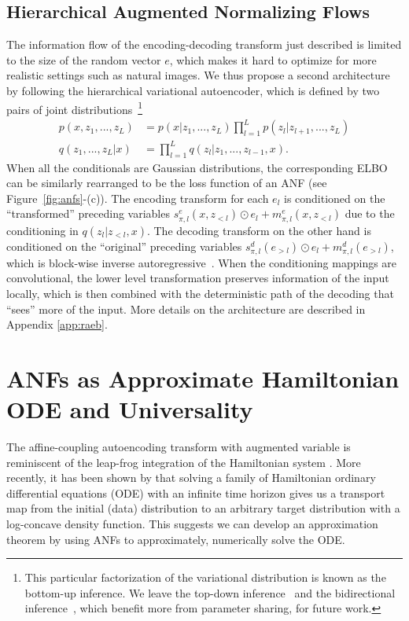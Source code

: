 \documentclass{article}
\begin{document}
\subsection{Hierarchical Augmented Normalizing Flows}
The information flow of the encoding-decoding transform just described is limited to the size of the random vector $e$, which makes it hard to optimize for more realistic settings such as natural images. 
We thus propose a second architecture by following the hierarchical variational autoencoder, which is defined by two pairs of joint distributions~\footnote{This particular factorization of the variational distribution is known as the bottom-up inference. We leave the top-down inference~\citep{kingma2016improved} and the bidirectional inference~\citep{maaloe2019biva}, which benefit more from parameter sharing, for future work.} 
\begin{align*}
p(x,z_1,...,z_L)&=p(x|z_1,...,z_L)\prod_{l=1}^L p(z_l|z_{l+1},...,z_L) \\
q(z_1,...,z_L|x)&=\prod_{l=1}^L q(z_l|z_{1},...,z_{l-1}, x).
\end{align*}
When all the conditionals are Gaussian distributions, the corresponding ELBO can be similarly rearranged to be the loss function of an ANF (see Figure~\ref{fig:anfs}-(c)). 
The encoding transform for each $e_l$ is conditioned on the ``transformed'' preceding variables  $s_{\pi, l}^e(x,z_{<l})\odot e_l + m_{\pi, l}^e(x,z_{<l})$ due to the conditioning in $q(z_l|z_{<l},x)$.
The decoding transform on the other hand is conditioned on the ``original'' preceding variables $s_{\pi, l}^d(e_{>l})\odot e_l + m_{\pi, l}^d(e_{>l})$, which is block-wise inverse autoregressive~\citep{kingma2016improved}. 
When the conditioning mappings are convolutional, the lower level transformation preserves information of the input locally, which is then combined with the deterministic path of the decoding that ``sees'' more of the input. More details on the architecture are described in Appendix \ref{app:raeb}.
 



\section{ANFs as Approximate Hamiltonian ODE and Universality}
The affine-coupling autoencoding transform with augmented variable is reminiscent of the leap-frog integration of the Hamiltonian system \citep{neal2011mcmc}. 
More recently, it has been shown by \citet{taghvaei19a} that solving a family of Hamiltonian ordinary differential equations (ODE) with an infinite time horizon gives us a transport map from the initial (data) distribution to an arbitrary target distribution with a log-concave density function. 
This suggests we can develop an approximation theorem by using ANFs to approximately, numerically solve the ODE.
\end{document}
